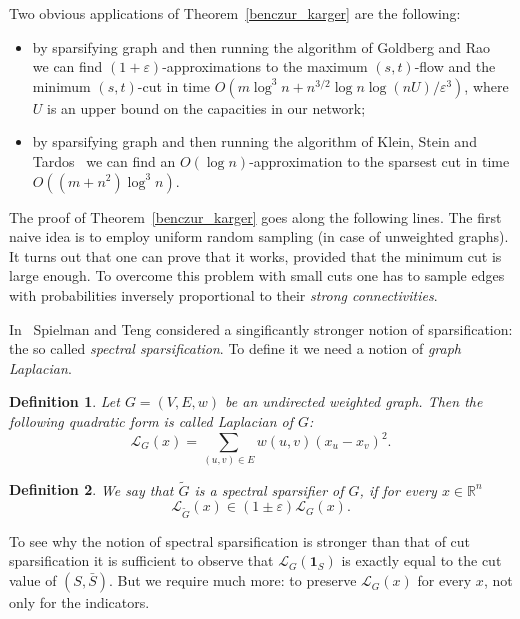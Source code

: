 \documentclass[12pt]{article}
\newcommand{\Rbb}{\mathbb{R}}
\newcommand{\eps}{\varepsilon}
\newtheorem{definition}{Definition}
\begin{document}
    Two obvious applications of Theorem~\ref{benczur_karger} are the following:
    \begin{itemize}
        \item by sparsifying graph and then running the algorithm of Goldberg and Rao~\cite{GR98} we can find
        $(1 + \eps)$-approximations to the maximum $(s, t)$-flow and the minimum $(s, t)$-cut in time
        $O(m \log^3 n + n^{3/2} \log n \log(nU) / \eps^3)$, where $U$ is an upper bound on the capacities in our network;
        \item by sparsifying graph and then running the algorithm of Klein, Stein and Tardos~\cite{KST90} we can find
        an $O(\log n)$-approximation to the sparsest cut in time $O((m + n^2) \log^3 n)$.
    \end{itemize}

    The proof of Theorem~\ref{benczur_karger} goes along the following lines. The first naive idea is to employ uniform
    random sampling (in case of unweighted graphs).
    It turns out that one can prove that it works, provided that the minimum cut is large enough.
    To overcome this problem with small cuts one has to sample edges with probabilities inversely proportional to their
    \emph{strong connectivities}.

    In~\cite{ST11} Spielman and Teng considered a singificantly stronger notion of sparsification: the so called
    \emph{spectral sparsification}. To define it we need a notion of \emph{graph Laplacian}.

    \begin{definition}
        Let $G = (V, E, w)$ be an undirected weighted graph. Then the following quadratic form is called \emph{Laplacian}
        of $G$:
        $$
            \mathcal{L}_G(x) = \sum_{(u, v) \in E} w(u, v) (x_u - x_v)^2.
        $$
    \end{definition}
    \begin{definition}
        We say that $\tilde{G}$ is a spectral sparsifier of $G$, if for every $x \in \Rbb^n$
        $$
            \mathcal{L}_{\tilde{G}}(x) \in (1 \pm \eps) \mathcal{L}_G(x).
        $$
    \end{definition}

    To see why the notion of spectral sparsification is stronger than that of cut sparsification it is sufficient to observe
    that $\mathcal{L}_G(\mathbf{1}_S)$ is exactly equal to the cut value of $(S, \bar{S})$.
    But we require much more: to preserve $\mathcal{L}_G(x)$ for every $x$, not only for the indicators.
\end{document}
